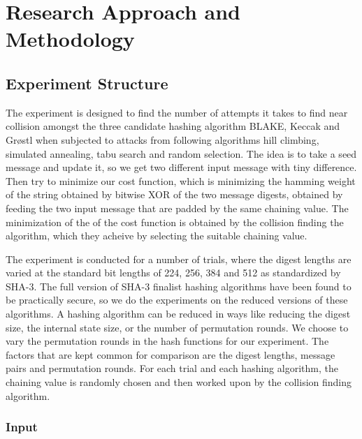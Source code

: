 \chapter{Research Approach and Methodology}

\section{Experiment Structure}

The experiment is designed to find the number of attempts it takes to find near collision amongst the three
candidate hashing algorithm BLAKE, Keccak and Gr{\o}stl when subjected to attacks from following algorithms
hill climbing, simulated annealing, tabu search and random selection. The idea is to take a seed message and
update it, so we get two different input message with tiny difference. Then try to minimize our cost function,
which is minimizing the hamming weight of the string obtained by bitwise XOR of the two message digests, 
obtained by feeding the two input message that are padded by the same chaining value. The minimization of the
of the cost function is obtained by the collision finding the algorithm, which they acheive by selecting
the suitable chaining value.

The experiment is conducted for a number of trials, where the digest lengths are varied at the standard bit
lengths of 224, 256, 384 and 512 as standardized by SHA-3. The full version of SHA-3 finalist hashing algorithms
have been found to be practically secure, so we do the experiments on the reduced versions of these algorithms.
A hashing algorithm can be reduced in ways like reducing the digest size, the internal state size, or the
number of permutation rounds. We choose to vary the permutation rounds in the hash functions for our experiment.
The factors that are kept common for comparison are the digest lengths, message pairs and permutation rounds.
For each trial and each hashing algorithm, the chaining value is randomly chosen and then worked upon by
the collision finding algorithm.

\subsection{Input}

